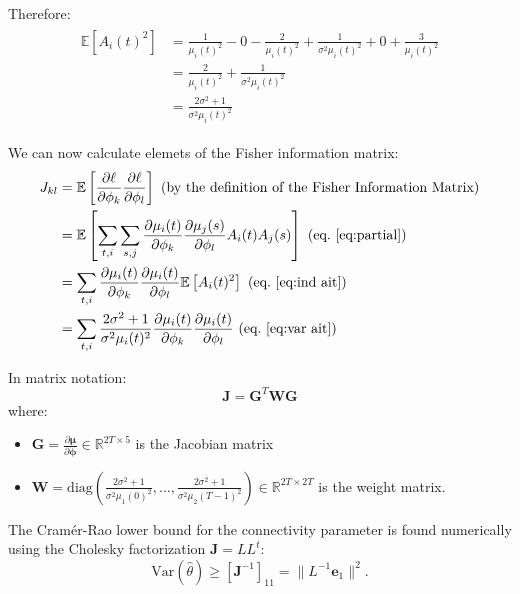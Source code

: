 Therefore:
\begin{align}\label{eq:var ait}
  \begin{split}
    \mathbb{E}[A_i(t)^2] &= \frac{1}{\mu_i(t)^2} - 0 - \frac{2}{\mu_i(t)^2} +
    \frac{1}{\sigma^2\mu_i(t)^2} +0 + \frac{3}{\mu_i(t)^2} \\
    &= \frac{2}{\mu_i(t)^2} + \frac{1}{\sigma^2\mu_i(t)^2} \\
    &= \frac{2\sigma^2 + 1}{\sigma^2\mu_i(t)^2}
  \end{split}
\end{align}



We can now calculate elemets of the Fisher information matrix:
\begin{align}
  \begin{split}
  J_{kl} &= \mathbb{E}\left[\frac{\partial \ell}{\partial \phi_k}
    \frac{\partial \ell}{\partial \phi_l}\right] \text{ (by the definition of
    the Fisher Information Matrix)}\\
  &= \mathbb{E} \left [\sum_{t,i} \sum_{s,j} \frac{\partial
      \mu_i(t)}{\partial \phi_k} \frac{\partial \mu_j(s)}{\partial
      \phi_l} A_i(t) A_j(s) \right ] \text{ (eq.~\eqref{eq:partial})} \\
  &= \sum_{t,i} \frac{\partial \mu_i(t)}{\partial
    \phi_k}\frac{\partial \mu_i(t)}{\partial \phi_l} \mathbb{E} \left
  [A_i(t)^2 \right ] \text{ (eq.~\eqref{eq:ind ait})}\\
  &= \sum_{t,i} \frac{2\sigma^2+1}{\sigma^2\mu_i(t)^2}\frac{\partial \mu_i(t)}{\partial
    \phi_k}\frac{\partial \mu_i(t)}{\partial \phi_l}  \text{ (eq.~\eqref{eq:var ait})}\\
  \end{split}
\end{align}


In matrix notation:
\begin{equation*}
\mathbf{J} = \mathbf{G}^T \mathbf{W} \mathbf{G}
\end{equation*}
where:
\begin{itemize}
\item $\mathbf{G} = \frac{\partial \boldsymbol{\mu}}{\partial \boldsymbol{\phi}} \in \mathbb{R}^{2T \times 5}$ is the Jacobian matrix
\item $\mathbf{W} = \text{diag}(\frac{2\sigma^2 + 1}{\sigma^2\mu_1(0)^2}, \ldots, \frac{2\sigma^2 + 1}{\sigma^2\mu_2(T-1)^2}) \in \mathbb{R}^{2T \times 2T}$ is the weight matrix.
\end{itemize}


The Cramér-Rao lower bound for the connectivity parameter is found
numerically using the Cholesky factorization $\mathbf{J} = LL^t$:
\begin{equation*}
\text{Var}(\hat{\theta}) \geq [\mathbf{J}^{-1}]_{11} = \|L^{-1}\mathbf{e}_1\|^2.
\end{equation*}
